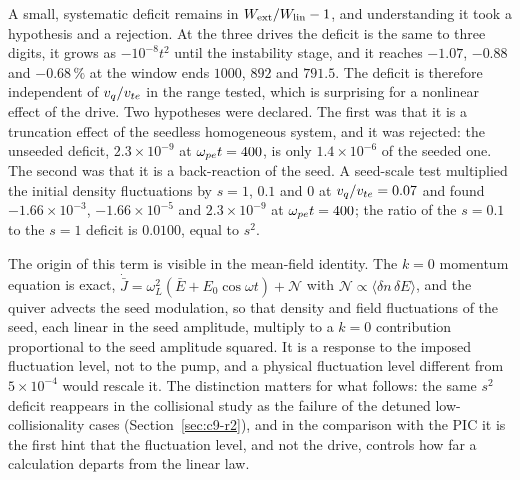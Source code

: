 A small, systematic deficit remains in $W_{\rm ext}/W_{\rm lin}-1$, and understanding it took a hypothesis and a rejection. At the three drives the deficit is the same to three digits, it grows as $-10^{-8}t^2$ until the instability stage, and it reaches $-1.07$, $-0.88$ and $-0.68\,\%$ at the window ends $1000$, $892$ and $791.5$. The deficit is therefore independent of $v_q/v_{te}$ in the range tested, which is surprising for a nonlinear effect of the drive. Two hypotheses were declared. The first was that it is a truncation effect of the seedless homogeneous system, and it was rejected: the unseeded deficit, $2.3\times10^{-9}$ at $\omega_{pe} t=400$, is only $1.4\times10^{-6}$ of the seeded one. The second was that it is a back-reaction of the seed. A seed-scale test multiplied the initial density fluctuations by $s=1$, $0.1$ and $0$ at $v_q/v_{te}=0.07$ and found $-1.66\times10^{-3}$, $-1.66\times10^{-5}$ and $2.3\times10^{-9}$ at $\omega_{pe} t=400$; the ratio of the $s=0.1$ to the $s=1$ deficit is $0.0100$, equal to $s^2$.

The origin of this term is visible in the mean-field identity. The $k=0$ momentum equation is exact, $\dot{\bar J}=\omega_L^2(\bar E+E_0\cos\omega t)+\mathcal N$ with $\mathcal N\propto\langle\delta n\,\delta E\rangle$, and the quiver advects the seed modulation, so that density and field fluctuations of the seed, each linear in the seed amplitude, multiply to a $k=0$ contribution proportional to the seed amplitude squared. It is a response to the imposed fluctuation level, not to the pump, and a physical fluctuation level different from $5\times10^{-4}$ would rescale it. The distinction matters for what follows: the same $s^2$ deficit reappears in the collisional study as the failure of the detuned low-collisionality cases (Section~\ref{sec:c9-r2}), and in the comparison with the PIC it is the first hint that the fluctuation level, and not the drive, controls how far a calculation departs from the linear law.


